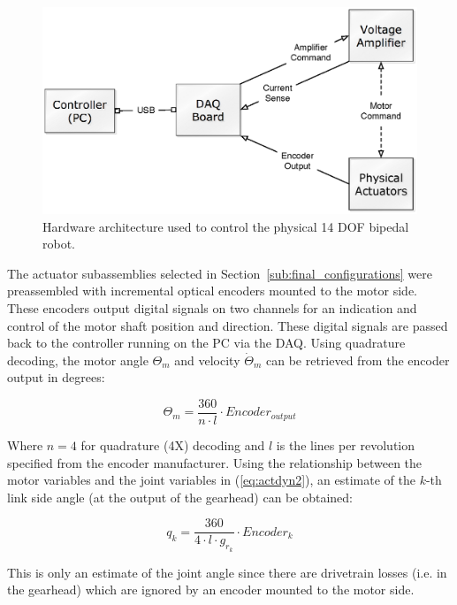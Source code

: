 \begin{figure}[!h]
	\centering
    \includegraphics[scale=0.65]{fig/experiments/hilarchitecture.eps} 
  	\caption{Hardware architecture used to control the physical 14 DOF bipedal robot.}
	\label{fig:hilarch}
\end{figure}

The actuator subassemblies selected in Section~\ref{sub:final_configurations} were preassembled with incremental optical encoders mounted to the motor side. These encoders output digital signals on two channels for an indication and control of the motor shaft position and direction.  These digital signals are passed back to the controller running on the PC via the DAQ. Using quadrature decoding, the motor angle $\Theta _m$ and velocity $\dot{\Theta}_m$ can be retrieved from the encoder output in degrees: 

\begin{equation}
	{\Theta _m} = \frac{{360}}{{n \cdot l}} \cdot Encoder_{output}
\end{equation}

Where $n = 4$ for quadrature (4X) decoding and $l$ is the lines per revolution specified from the encoder manufacturer. Using the relationship between the motor variables and the joint variables in (\ref{eq:actdyn2}), an estimate of the $k$-th link side angle (at the output of the gearhead) can be obtained: 

\begin{equation}
	{q_k} = \frac{{360}}{{4 \cdot l \cdot {g_{{r_k}}}}} \cdot Encode{r_k}
	\label{eq:quadrature}
\end{equation}

This is only an estimate of the joint angle since there are drivetrain losses (i.e. in the gearhead) which are ignored by an encoder mounted to the motor side. 

